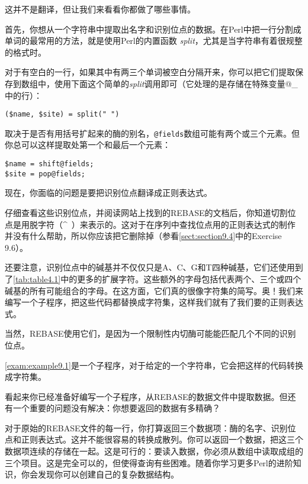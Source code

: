 这并不是翻译，但让我们来看看你都做了哪些事情。

首先，你想从一个字符串中提取出名字和识别位点的数据。在Perl中把一行分割成单词的最常用的方法，就是使用Perl的内置函数 \textit{split}，尤其是当字符串有着很规整的格式时。

对于有空白的一行，如果其中有两三个单词被空白分隔开来，你可以把它们提取保存到数组中，使用下面这个简单的\textit{split}调用即可（它处理的是存储在特殊变量@\_中的行）：

\begin{lstlisting}
($name, $site) = split(" ")
\end{lstlisting}

取决于是否有用括号扩起来的酶的别名，\verb|@fields|数组可能有两个或三个元素。但你总可以这样提取处第一个和最后一个元素：

\begin{lstlisting}
$name = shift@fields;
$site = pop@fields;
\end{lstlisting}

现在，你面临的问题是要把识别位点翻译成正则表达式。

仔细查看这些识别位点，并阅读网站上找到的REBASE的文档后，你知道切割位点是用脱字符（\^~）来表示的。这对于在序列中查找位点用的正则表达式的制作并没有什么帮助，所以你应该把它删除掉（参看\autoref{sect:section9.4}中的Exercise 9.6）。

还要注意，识别位点中的碱基并不仅仅只是A、C、G和T四种碱基，它们还使用到了\autoref{tab:table4.1}中的更多的扩展字符。这些额外的字母包括代表两个、三个或四个碱基的所有可能组合的字母。在这方面，它们真的很像字符集的简写。奥！我们来编写一个子程序，把这些代码都替换成字符集，这样我们就有了我们要的正则表达式。

当然，REBASE使用它们，是因为一个限制性内切酶可能能匹配几个不同的识别位点。

\autoref{exam:example9.1}是一个子程序，对于给定的一个字符串，它会把这样的代码转换成字符集。



看起来你已经准备好编写一个子程序，从REBASE的数据文件中提取数据。但还有一个重要的问题没有解决：你想要返回的数据有多精确？

对于原始的REBASE文件的每一行，你打算返回三个数据项：酶的名字、识别位点和正则表达式。这并不能很容易的转换成散列。你可以返回一个数据，把这三个数据项连续的存储在一起。这是可行的：要读入数据，你必须从数组中读取成组的三个项目。这是完全可以的，但使得查询有些困难。随着你学习更多Perl的进阶知识，你会发现你可以创建自己的复杂数据结构。

